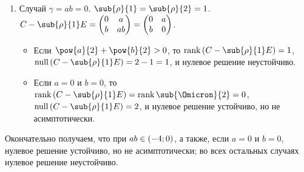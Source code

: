 \documentclass[a5paper,10pt]{article}
\begin{document}
\begin{enumerate}
    \item Случай $\gamma = ab = 0$.
    $\sub{\rho}{1} = \sub{\rho}{2} = 1$.
    $C -\sub{\rho}{1} E 
        = \begin{pmatrix} 0 & a \\ b & ab \end{pmatrix} 
        = \begin{pmatrix} 0 & a \\ b & 0 \end{pmatrix}$.
    \begin{itemize}
        \item Если $\pow{a}{2} + \pow{b}{2} > 0$,
            то $\rank\br{C - \sub{\rho}{1} E} = 1$,
            $\nullity\br{C - \sub{\rho}{1} E} = 2 - 1 = 1$,
            и нулевое решение неустойчиво.
        \item Если $a = 0$ и $b = 0$, 
        то $\rank\br{C -\sub{\rho}{1} E} 
            = \rank \sub{\Omicron}{2} = 0$,
        $\nullity\br{C -\sub{\rho}{1} E} = 2$,
        и нулевое решение устойчиво, но не асимптотически.
    \end{itemize}
\end{enumerate}

Окончательно получаем, что при $ab \in \left(\hspace{0.01em}-4; 0\hspace{0.01em}\right)$, а также,
если $a = 0$ и $b = 0$, нулевое \linebreak решение устойчиво, но не асимптотически;
во всех остальных случаях нулевое решение неустойчиво.
\end{document}
